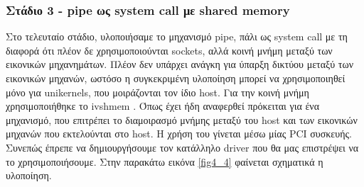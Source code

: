 
\subsubsection{Στάδιο 3 - pipe ως system call με shared memory}

Στο τελευταίο στάδιο, υλοποιήσαμε το μηχανισμό pipe, πάλι ως system call με τη
διαφορά ότι πλέον δε χρησιμοποιούνται sockets, αλλά κοινή μνήμη μεταξύ των
εικονικών μηχανημάτων. Πλέον δεν υπάρχει ανάγκη για ύπαρξη δικτύου μεταξύ των
εικονικών μηχανών, ωστόσο η συγκεκριμένη υλοποίηση μπορεί να χρησιμοποιηθεί
μόνο για unikernels, που μοιράζονται τον ίδιο host. Για την κοινή μνήμη
χρησιμοποιήθηκε το ivshmem \cite{macdonell2011shared}. Όπως έχει ήδη αναφερθεί
πρόκειται για ένα μηχανισμό, που επιτρέπει το διαμοιρασμό μνήμης μεταξύ του
host και των εικονικών μηχανών που εκτελούνται στο host. Η χρήση του γίνεται
μέσω μίας PCI συσκευής. Συνεπώς έπρεπε να δημιουργήσουμε τον κατάλληλο driver
που θα μας επιστρέψει να το χρησιμοποιήσουμε. Στην παρακάτω εικόνα \ref{fig4_4}
φαίνεται σχηματικά η υλοποίηση. 

